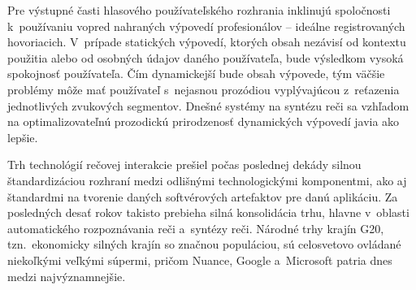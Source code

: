 \begin{multicols}{2}
Pre výstupné časti hlasového používateľského rozhrania inklinujú spoločnosti k~používaniu vopred nahraných výpovedí profesionálov – ideálne registrovaných hovoriacich. V~prípade statických výpovedí, ktorých obsah nezávisí od kontextu použitia alebo od osobných údajov daného používateľa, bude výsledkom vysoká spokojnosť používateľa. Čím dynamickejší bude obsah výpovede, tým väčšie problémy môže mať používateľ s~nejasnou prozódiou vyplývajúcou z~reťazenia jednotlivých zvukových segmentov. Dnešné systémy na syntézu reči sa vzhľadom na optimalizovateľnú prozodickú prirodzenosť dynamických výpovedí javia ako lepšie. 

Trh technológií rečovej interakcie prešiel počas poslednej dekády silnou štandardizáciou rozhraní medzi odlišnými technologickými komponentmi, ako aj štandardmi na tvorenie daných softvérových artefaktov pre danú aplikáciu. Za posledných desať rokov takisto prebieha silná konsolidácia trhu, hlavne v~oblasti automatického rozpoznávania reči a~syntézy reči. Národné trhy krajín G20, tzn.~ekonomicky silných krajín so značnou populáciou, sú celosvetovo ovládané niekoľkými veľkými súpermi, pričom Nuance, Google a~Microsoft patria dnes medzi najvýznamnejšie.


\end{multicols}
